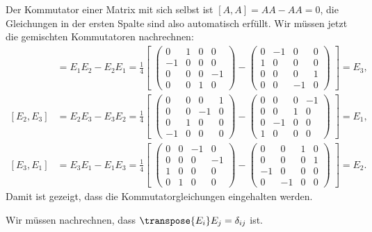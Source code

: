 \begin{loesung}
\begin{teilaufgaben}
\item
Der Kommutator einer Matrix mit sich selbst ist $[A,A]=AA-AA=0$, die
Gleichungen in der ersten Spalte sind also automatisch erfüllt.
Wir müssen jetzt die gemischten Kommutatoren nachrechnen:
\begin{align*}
[E_1,E_2]&=E_1E_2-E_2E_1=\frac14\left[\;
\begin{pmatrix}
 0& 1& 0& 0\\
-1& 0& 0& 0\\
 0& 0& 0&-1\\
 0& 0& 1& 0
\end{pmatrix}
-
\begin{pmatrix}
 0&-1& 0& 0\\
 1& 0& 0& 0\\
 0& 0& 0& 1\\
 0& 0&-1& 0
\end{pmatrix}\;
\right]
=E_3,
\\
[E_2,E_3]&=E_2E_3-E_3E_2=\frac14\left[\;
\begin{pmatrix}
 0& 0& 0& 1\\
 0& 0&-1& 0\\
 0& 1& 0& 0\\
-1& 0& 0& 0
\end{pmatrix}
-
\begin{pmatrix}
 0& 0& 0&-1\\
 0& 0& 1& 0\\
 0&-1& 0& 0\\
 1& 0& 0& 0
\end{pmatrix}\;
\right]
=E_1,
\\
[E_3,E_1]&=E_3E_1-E_1E_3=\frac14\left[\;
\begin{pmatrix}
 0& 0&-1& 0\\
 0& 0& 0&-1\\
 1& 0& 0& 0\\
 0& 1& 0& 0
\end{pmatrix}
-
\begin{pmatrix}
 0& 0& 1& 0\\
 0& 0& 0& 1\\
-1& 0& 0& 0\\
 0&-1& 0& 0
\end{pmatrix}\;
\right]
=E_2.
\end{align*}
Damit ist gezeigt, dass die Kommutatorgleichungen eingehalten werden.
\item
Wir müssen nachrechnen, dass $\transpose{E_i}E_j=\delta_{ij}$ ist.

\end{teilaufgaben}
\end{loesung}
